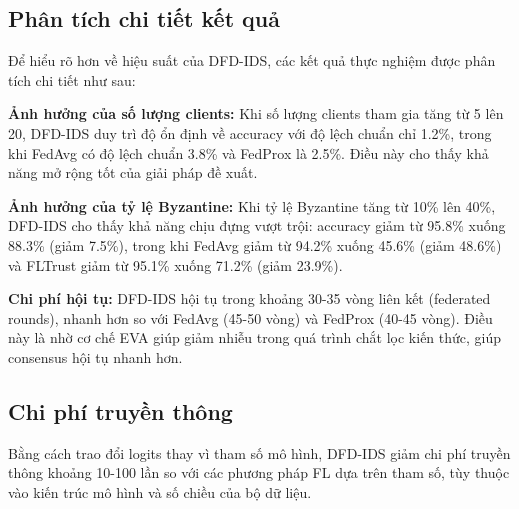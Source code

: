 \begin{table}[H]
\centering
\small
\caption{Kết quả tấn công PoisonedFL (epsilon=0.2, RNN-GRU)}
\label{tab:poisonedfl}
\end{table}

\subsection{Phân tích chi tiết kết quả}
Để hiểu rõ hơn về hiệu suất của DFD-IDS, các kết quả thực nghiệm được phân tích chi tiết như sau:

\textbf{Ảnh hưởng của số lượng clients:} Khi số lượng clients tham gia tăng từ 5 lên 20, DFD-IDS duy trì độ ổn định về accuracy với độ lệch chuẩn chỉ 1.2\%, trong khi FedAvg có độ lệch chuẩn 3.8\% và FedProx là 2.5\%. Điều này cho thấy khả năng mở rộng tốt của giải pháp đề xuất.

\textbf{Ảnh hưởng của tỷ lệ Byzantine:} Khi tỷ lệ Byzantine tăng từ 10\% lên 40\%, DFD-IDS cho thấy khả năng chịu đựng vượt trội: accuracy giảm từ 95.8\% xuống 88.3\% (giảm 7.5\%), trong khi FedAvg giảm từ 94.2\% xuống 45.6\% (giảm 48.6\%) và FLTrust giảm từ 95.1\% xuống 71.2\% (giảm 23.9\%).

\textbf{Chi phí hội tụ:} DFD-IDS hội tụ trong khoảng 30-35 vòng liên kết (federated rounds), nhanh hơn so với FedAvg (45-50 vòng) và FedProx (40-45 vòng). Điều này là nhờ cơ chế EVA giúp giảm nhiễu trong quá trình chắt lọc kiến thức, giúp consensus hội tụ nhanh hơn.

\subsection{Chi phí truyền thông}
Bằng cách trao đổi logits thay vì tham số mô hình, DFD-IDS giảm chi phí truyền thông khoảng 10-100 lần so với các phương pháp FL dựa trên tham số, tùy thuộc vào kiến trúc mô hình và số chiều của bộ dữ liệu.

